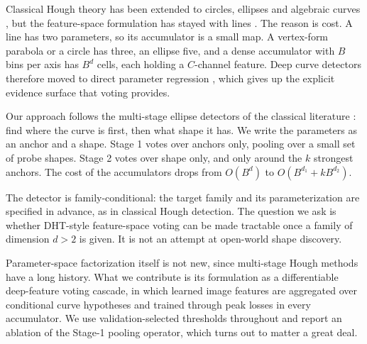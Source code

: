 \documentclass[11pt]{article}
\begin{document}
Classical Hough theory has been extended to circles, ellipses and algebraic curves \citep{ballard1981,torrente2014,massone2015}, but the feature-space formulation has stayed with lines \citep{zhao2021deep,lin2020houghpriors,houglanenet2023}. The reason is cost. A line has two parameters, so its accumulator is a small map. A vertex-form parabola or a circle has three, an ellipse five, and a dense accumulator with $B$ bins per axis has $B^{d}$ cells, each holding a $C$-channel feature. Deep curve detectors therefore moved to direct parameter regression \citep{polylanenet2020,lstr2021,feng2022bezier}, which gives up the explicit evidence surface that voting provides.

Our approach follows the multi-stage ellipse detectors of the classical literature \citep{yuen1989ellipse}: find where the curve is first, then what shape it has. We write the parameters as an anchor and a shape. Stage 1 votes over anchors only, pooling over a small set of probe shapes. Stage 2 votes over shape only, and only around the $k$ strongest anchors. The cost of the accumulators drops from $O(B^{d})$ to $O(B^{d_1}+kB^{d_2})$.

The detector is family-conditional: the target family and its parameterization are specified in advance, as in classical Hough detection. The question we ask is whether DHT-style feature-space voting can be made tractable once a family of dimension $d>2$ is given. It is not an attempt at open-world shape discovery.

Parameter-space factorization itself is not new, since multi-stage Hough methods have a long history. What we contribute is its formulation as a differentiable deep-feature voting cascade, in which learned image features are aggregated over conditional curve hypotheses and trained through peak losses in every accumulator. We use validation-selected thresholds throughout and report an ablation of the Stage-1 pooling operator, which turns out to matter a great deal.
\end{document}
